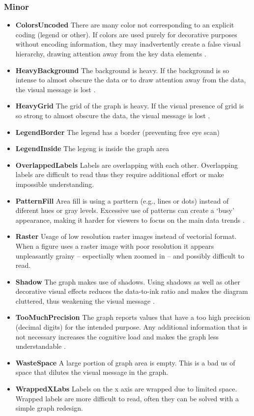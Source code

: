 \documentclass[
  10pt,
  conference,
]{IEEEtran}%
\begin{document}
\subsubsection{Minor}\label{minor}

\begin{itemize}
\item
  \textbf{ColorsUncoded} There are many color not corresponding to an
  explicit coding (legend or other). If colors are used purely for
  decorative purposes without encoding information, they may
  inadvertently create a false visual hierarchy, drawing attention away
  from the key data elements .
\item
  \textbf{HeavyBackground} The background is heavy. If the background is
  so intense to almost obscure the data or to draw attention away from
  the data, the visual message is lost
  .
\item
  \textbf{HeavyGrid} The grid of the graph is heavy. If the visual
  presence of grid is so strong to almost obscure the data, the visual
  message is lost .
\item
  \textbf{LegendBorder} The legend has a border (preventing free eye
  scan)
\item
  \textbf{LegendInside} The legeng is inside the graph area
\item
  \textbf{OverlappedLabels} Labels are overlapping with each other.
  Overlapping labels are difficult to read thus they require additional
  effort or make impossible understanding.
\item
  \textbf{PatternFill} Area fill is using a parttern (e.g., lines or
  dots) instead of diferent hues or gray levels. Excessive use of
  patterns can create a `busy' appearance, making it harder for viewers
  to focus on the main data trends .
\item
  \textbf{Raster} Usage of low resolution raster images instead of
  vectorial format. When a figure uses a raster image with poor
  resolution it appears unpleasantly grainy -- espectially when zoomed
  in -- and possibly difficult to read.
\item
  \textbf{Shadow} The graph makes use of shadows. Using shadows as well
  as other decorative visual effects reduces the data-to-ink ratio and
  makes the diagram cluttered, thus weakening the visual message
  .
\item
  \textbf{TooMuchPrecision} The graph reports values that have a too
  high precision (decimal digits) for the intended purpose. Any
  additional information that is not necessary increases the cognitive
  load and makes the graph less understandable
  .
\item
  \textbf{WasteSpace} A large portion of graph area is empty. This is a
  bad us of space that dilutes the visual message in the graph.
\item
  \textbf{WrappedXLabs} Labels on the x axis are wrapped due to limited
  space. Wrapped labels are more difficult to read, often they can be
  solved with a simple graph redesign.
\end{itemize}
\end{document}
